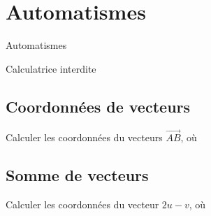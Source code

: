
\AdvanceDate[3]



\section{Automatismes}

\begin{frame}

\centering \huge
Automatismes

\large
Calculatrice interdite

\end{frame}

\subsection{Coordonnées de vecteurs}

\begin{frame}{1}	
	Calculer les coordonnées du vecteurs $\overrightarrow{AB}$, où
\end{frame}

\subsection{Somme de vecteurs}

\begin{frame}{2}	

	Calculer les coordonnées du vecteur $2u - v$, où
	
\end{frame}

